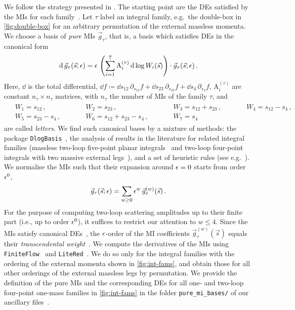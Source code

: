 \documentclass[main.tex]{subfiles}
\begin{document}
We follow the strategy presented in . The starting point are the \acp{DE} satisfied by the \acp{MI} for each family~\cite{Barucchi:1973zm,KOTIKOV1991158,KOTIKOV1991123,Gehrmann:1999as,Bern:1993kr}. Let $\tau$ label an integral family, e.g.\ the double-box in \cref{fig:double-box} for an arbitrary permutation of the external massless momenta. We choose a basis of \emph{pure} \acp{MI} $\vec{g}_{\tau}$, that is, a basis which satisfies \acp{DE} in the canonical form~\cite{Henn:2013pwa}
\begin{align}
\label{eqQED:canonicalDEs}
\mathrm{d} \, \vec{g}_{\tau}(\vec{s}; \epsilon) = \epsilon \, \left( \sum_{i=1}^{7} \mathrm{A}^{(\tau)}_i \, \mathrm{d} \log W_i(\vec{s}) \right) \cdot \vec{g}_{\tau}(\vec{s}; \epsilon) \,.
\end{align}
Here, $\dd$ is the total differential, $\dd f \coloneqq \dd s_{12} \, \partial_{s_{12}} f + \dd s_{23} \, \partial_{s_{23}} f +  \dd s_{4} \, \partial_{s_{4}} f $, $\mathrm{A}^{(\tau)}_i$ are constant $n_{\tau} \times n_{\tau}$ matrices, with $n_{\tau}$ the number of \acp{MI} of the family $\tau$, and 
\begin{align}
\label{eqQED:alphabet}
\begin{alignedat}{4}
& W_1 = s_{12} \,, 
&& W_2 = s_{23} \,, 
&& W_3 = s_{12} + s_{23} \,, \qquad
&& W_4 = s_{12} - s_4 \,,  \\
& W_5 = s_{23} - s_4 \,, \qquad
&& W_6 = s_{12} + s_{23} - s_4 \,, \qquad
&& W_7 = s_4 \, &&
\end{alignedat}
\end{align}
are called \emph{letters}. We find such canonical bases by a mixture of methods: the package \texttt{DlogBasis}~\cite{Henn:2020lye}, the analysis of results in the literature for related integral families (massless two-loop five-point planar integrals~\cite{Gehrmann:2015bfy} and two-loop four-point integrals with two massive external legs~\cite{Henn:2014lfa,Caola:2014lpa}), and a set of heuristic rules (see e.g.\ ).
We normalise the \acp{MI} such that their expansion around $\epsilon=0$ starts from order $\epsilon^0$,
\begin{align}
\vec{g}_{\tau}(\vec{s} ; \epsilon) = \sum_{w \ge 0} \epsilon^w \, \vec{g}^{(w)}_{\tau}(\vec{s}) \,.
\end{align}
For the purpose of computing two-loop scattering amplitudes up to their finite part (i.e., up to order $\epsilon^0$), it suffices to restrict our attention to $w \le 4$.
Since the \acp{MI} satisfy canonical \acp{DE}~, the $\epsilon$-order of the \ac{MI} coefficients $\vec{g}^{(w)}_{\tau}(\vec{s})$ equals their \emph{transcendental weight}~\cite{Henn:2013pwa}.
We compute the derivatives of the \acp{MI} using \texttt{FiniteFlow}~\cite{Peraro:2019svx} and \texttt{LiteRed}~\cite{Lee:2012cn}.
We do so only for the integral families with the ordering of the external momenta shown in \cref{fig:int-fams}, and obtain those for all other orderings of the external massless legs by permutation. 
We provide the definition of the pure \acp{MI} and the corresponding \acp{DE} for all one- and two-loop four-point one-mass families in \cref{fig:int-fams} in the folder \texttt{pure\_mi\_bases/} of our ancillary files~\cite{zenodo}. 
\end{document}
